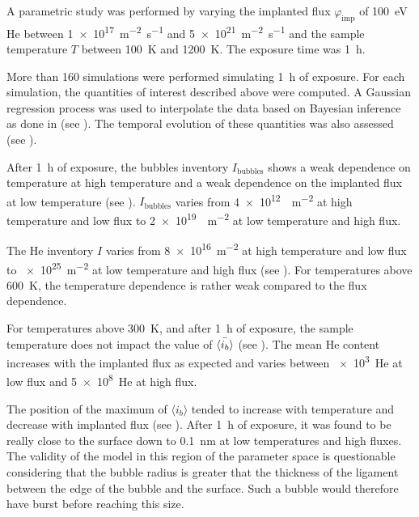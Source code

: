 A parametric study was performed by varying the implanted flux $\varphi_\mathrm{imp}$ of \SI{100}{eV} He between \SI{1e17}{m^{-2} s^{-1}} and \SI{5e21}{m^{-2} s^{-1}} and the sample temperature $T$ between \SI{100}{K} and \SI{1200}{K}.
The exposure time was \SI{1}{h}.

More than 160 simulations were performed simulating \SI{1}{h} of exposure.
For each simulation, the quantities of interest described above were computed.
A Gaussian regression process  was used to interpolate the data based on Bayesian inference as done in  (see ).
The temporal evolution of these quantities was also assessed (see ).

After \SI{1}{h} of exposure, the bubbles inventory $I_\mathrm{bubbles}$ shows a weak dependence on temperature at high temperature and a weak dependence on the implanted flux at low temperature (see ).
$I_\mathrm{bubbles}$ varies from \SI{4e12}{ m^{-2}} at high temperature and low flux to \SI{2e19}{ m^{-2}} at low temperature and high flux.

The \gls{He} inventory $I$ varies from \SI{8e16}{m^{-2}} at high temperature and low flux to \SI{e25}{m^{-2}} at low temperature and high flux (see ).
For temperatures above \SI{600}{K}, the temperature dependence is rather weak compared to the flux dependence.

For temperatures above \SI{300}{K}, and after \SI{1}{h} of exposure, the sample temperature does not impact the value of $\Bar{\langle i_b \rangle}$ (see ).
The mean He content increases with the implanted flux as expected and varies between \SI{e3}{He} at low flux and \SI{5e8}{He} at high flux.

The position of the maximum of $\langle i_b \rangle$ tended to increase with temperature and decrease with implanted flux (see ).
After \SI{1}{h} of exposure, it was found to be really close to the surface down to \SI{0.1}{nm} at low temperatures and high fluxes.
The validity of the model in this region of the parameter space is questionable considering that the bubble radius is greater that the thickness of the ligament between the edge of the bubble and the surface.
Such a bubble would therefore have burst before reaching this size. 

